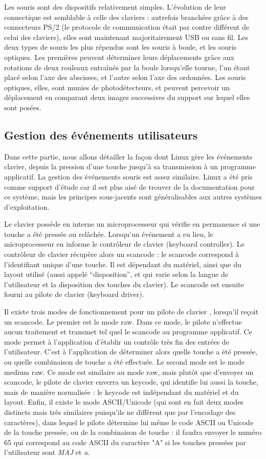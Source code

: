 Les souris sont des dispositifs relativement simples. L'évolution
de leur connectique est semblable à celle des claviers : autrefois
branchées grâce à des connecteurs PS/2 (le protocole de communication
était par contre différent de celui des claviers), elles sont maintenant
majoritairement USB ou sans fil. Les deux types de souris les plus
répendus sont les souris à boule, et les souris optiques. Les premières
peuvent déterminer leurs déplacements grâce aux rotations de deux
rouleaux entraînés par la boule lorsqu'elle tourne, l'un étant placé
selon l'axe des abscisses, et l'autre selon l'axe des ordonnées. Les
souris optiques, elles, sont munies de photodétecteurs, et peuvent
percevoir un déplacement en comparant deux images successives du support
sur lequel elles sont posées.

\subsection{Gestion des événements utilisateurs}

Dans cette partie, nous allons détailler la façon dont Linux gère les événements clavier, depuis la pression d'une touche jusqu'à sa transmission à un programme applicatif. La gestion des événements souris est assez similaire. Linux a été pris comme support d'étude car il est plus aisé de trouver de la documentation pour ce système, mais les principes sous-jacents sont généralisables aux autres systèmes d'exploitation.

Le clavier possède en interne un microprocesseur qui vérifie en permanence si une touche a été pressée ou relâchée. Lorsqu'un événement a eu lieu, le microprocesseur en informe le contrôleur de clavier (keyboard controller). Le contrôleur de clavier récupère alors un scancode : le scancode correspond à l'identifiant unique d'une touche. Il est dépendant du matériel, ainsi que du layout utilisé (aussi appelé ``disposition'', et qui varie selon la langue de l'utilisateur et la disposition des touches du clavier). Le scancode est ensuite fourni au pilote de clavier (keyboard driver). 

Il existe trois modes de fonctionnement pour un pilote de clavier \cite{Keb02}, lorsqu'il reçoit un scancode. Le premier est le mode raw. Dans ce mode, le pilote n'effectue aucun traitement et transmet tel quel le scancode au programme applicatif. Ce mode permet à l'application d'établir un contrôle très fin des entrées de l'utilisateur. C'est à l'application de déterminer alors quelle touche a été pressée, ou quelle combinaison de touche a été effectuée. Le second mode est le mode medium raw. Ce mode est similaire au mode raw, mais plutôt que d'envoyer un scancode, le pilote de clavier enverra un keycode, qui identifie lui aussi la touche, mais de manière normalisée : le keycode est indépendant du matériel et du layout. Enfin, il existe le mode ASCII/Unicode (qui sont en fait deux modes distincts mais très similaires puisqu'ils ne diffèrent que par l'encodage des caractères), dans lequel le pilote détermine lui même le code ASCII ou Unicode de la touche pressée, ou de la combinaison de touche : il faudra envoyer le numéro 65 qui correspond au code ASCII du caractère "A" si les touches pressées par l'utilisateur sont \textit{MAJ} et \textit{a}.

